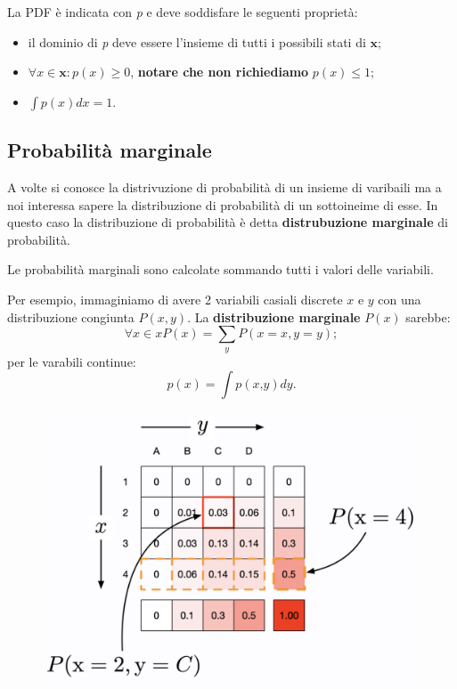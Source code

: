 La PDF è indicata con \textit{p} e deve soddisfare le seguenti proprietà:
\begin{itemize}
    \item il dominio di \textit{p} deve essere l'insieme di tutti i possibili stati di $\textbf{x}$;
    \item $\forall \textit{x}\in \textbf{x}:\textit{p}(\textit{x})\geq 0$, \textbf{notare che non richiediamo} $\textit{p}(\textit{x})\leq 1$;
    \item $\int \textit{p}(\textit{x})\textit{dx}=1$.
\end{itemize}

\subsection{Probabilità marginale}
A volte si conosce la distrivuzione di probabilità di un insieme di varibaili ma a noi interessa sapere la distribuzione di probabilità di un sottoineime di esse. In questo caso la distribuzione di probabilità è detta \textbf{distrubuzione marginale} di probabilità. 



Le probabilità marginali sono calcolate sommando tutti i valori delle variabili.


Per esempio, immaginiamo di avere 2 variabili casiali discrete $x$ e $y$ con una distribuzione congiunta $\textit{P}(x,y)$. La \textbf{distribuzione marginale} $\textit{P}(x)$ sarebbe:
\begin{equation}
    \forall \textit{x}\in x \textit{P}(\textit{x})=\sum_y\textit{P}(x=\textit{x},y=\textit{y});
\end{equation}
per le varabili continue:
\begin{equation}
    \textit{p}(\textit{x})=\int \textit{p}(\textit{x,y})\textit{dy}.
\end{equation}
\begin{figure}[!h]
    \includegraphics[scale=.5]{images/prerequisites/margProbability.png}
    \centering
\end{figure}
\newpage
